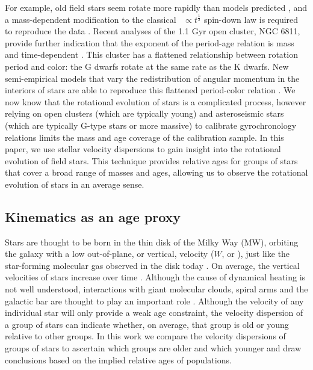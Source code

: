 For example, old field stars seem rotate more rapidly than models predicted
\citep{angus2015, vansaders2016, vansaders2018, metcalfe2019}, and a
mass-dependent modification to the classical \prot\ $\propto t^{\frac{1}{2}}$
spin-down law \citep{skumanich1972} is required to reproduce the data
\citep{vansaders2016, vansaders2018}.
Recent analyses of the 1.1 Gyr open cluster, NGC 6811, provide further
indication that the exponent of the period-age relation is mass and
time-dependent \citep{curtis2019 spada2019}.
This cluster has a flattened relationship between rotation period and
color: the G dwarfs rotate at the same rate as the K dwarfs.
New semi-empirical models that vary the redistribution of angular momentum in
the interiors of stars are able to reproduce this flattened period-color
relation \citep{spada2019}.
We now know that the rotational evolution of stars is a complicated process,
however relying on open clusters (which are typically young) and asteroseismic
stars (which are typically G-type stars or more massive) to calibrate
gyrochronology relations limits the mass and age coverage of the calibration
sample.
In this paper, we use stellar velocity dispersions to gain insight into the
rotational evolution of field stars.
This technique provides relative ages for groups of stars that cover a broad
range of masses and ages, allowing us to observe the rotational evolution of
stars in an average sense.

\subsection{Kinematics as an age proxy}

Stars are thought to be born in the thin disk of the Milky Way (MW), orbiting
the galaxy with a low out-of-plane, or vertical, velocity ($W$, or \vz),
just like the star-forming molecular gas observed in the disk today
\citep[\eg][]{stark1989, stark2005, aumer2009, martig2014, aumer2016}.
On average, the vertical velocities of stars increase over time
\citep[\eg][]{nordstrom2004, holmberg2007, holmberg2009, aumer2009,
casagrande2011}.
Although the cause of dynamical heating is not well understood, interactions
with giant molecular clouds, spiral arms and the galactic bar are thought to
play an important role \citep[see][for a review of secular evolution in the
MW]{sellwood2014}.
Although the velocity of any individual star will only provide a weak age
constraint, the velocity dispersion of a group of stars can indicate whether,
on average, that group is old or young relative to other groups.
In this work we compare the velocity dispersions of groups of stars to
ascertain which groups are older and which younger and draw conclusions based
on the implied relative ages of populations.

